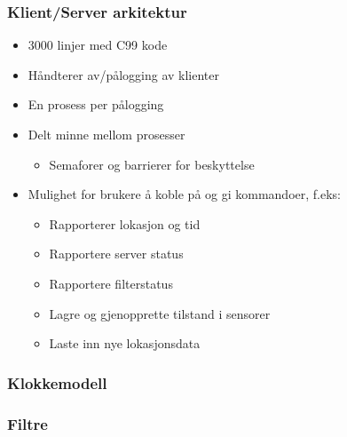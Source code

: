 \documentclass[xcolor=table]{beamer}
\begin{document}
\begin{frame}
  \frametitle{Klient/Server arkitektur}
  \begin{itemize}
    \item 3000 linjer med C99 kode
    \item Håndterer av/pålogging av klienter
    \item En prosess per pålogging
    \item Delt minne mellom prosesser
      \begin{itemize}
        \item Semaforer og barrierer for beskyttelse
      \end{itemize}
    \item Mulighet for brukere å koble på og gi kommandoer, f.eks:
      \begin{itemize}
        \item Rapporterer lokasjon og tid
        \item Rapportere server status
        \item Rapportere filterstatus
        \item Lagre og gjenopprette tilstand i sensorer
        \item Laste inn nye lokasjonsdata
      \end{itemize}
  \end{itemize}
\end{frame}

\subsubsection{Klokkemodell}
\begin{frame}
\end{frame}

\subsubsection{Filtre}
\begin{frame}
\end{frame}
\end{document}
